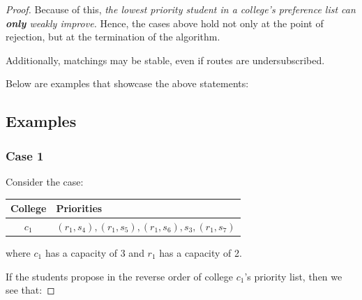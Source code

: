 \documentclass[runningheads]{llncs}
\begin{document}
\begin{proof}
    Because of this, \textit{the lowest priority student in a college's preference list can \textbf{only} weakly improve.} Hence, the cases above hold not only at the point of rejection, but at the termination of the algorithm.

    Additionally, matchings may be stable, even if routes are undersubscribed.

    Below are examples that showcase the above statements:

    \subsection{Examples}
    \subsubsection{Case 1}
    Consider the case:

    \begin{center}
        \begin{tabular}{ c|l }
            College&Priorities \\
            \hline
            $c_1$&$(r_1,s_4),(r_1,s_5),(r_1,s_6),s_3,(r_1,s_7)$ \\
        \end{tabular}
    \end{center}

    where $c_1$ has a capacity of 3 and $r_1$ has a capacity of 2.

    If the students propose in the reverse order of college $c_1$'s priority list, then we see that:


\end{proof}
\end{document}

